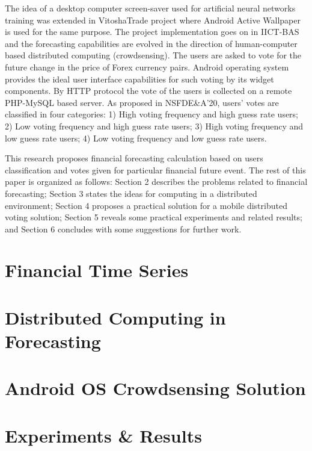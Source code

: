 \documentclass[runningheads]{llncs}
\begin{document}
The idea of a desktop computer screen-saver used for artificial neural networks training was extended in VitoshaTrade\cite{vitosha-trade-01} project where Android Active Wallpaper is used for the same purpose. The project implementation goes on in IICT-BAS and the forecasting capabilities are evolved in the direction of human-computer based distributed computing (crowdsensing\cite{crowdsensing-01}). The users are asked to vote\cite{voting-01} for the future change in the price of Forex currency pairs. Android operating system provides the ideal user interface capabilities for such voting by its widget components. By HTTP protocol the vote of the users is collected on a remote PHP-MySQL based server. As proposed in NSFDE\&A'20, users' votes are classified in four categories: 1) High voting frequency and high guess rate users; 2) Low voting frequency and high guess rate users; 3) High voting frequency and low guess rate users; 4) Low voting frequency and low guess rate users.

This research proposes financial forecasting calculation based on users classification and votes given for particular financial future event. The rest of this paper is organized as follows: Section 2 describes the problems related to financial forecasting; Section 3 states the ideas for computing in a distributed environment; Section 4 proposes a practical solution for a mobile distributed voting solution; Section 5 reveals some practical experiments and related results; and Section 6 concludes with some suggestions for further work.
%
\section{Financial Time Series}
%
\section{Distributed Computing in Forecasting}
%
\section{Android OS Crowdsensing Solution}
%
\section{Experiments \& Results}
%
\end{document}
